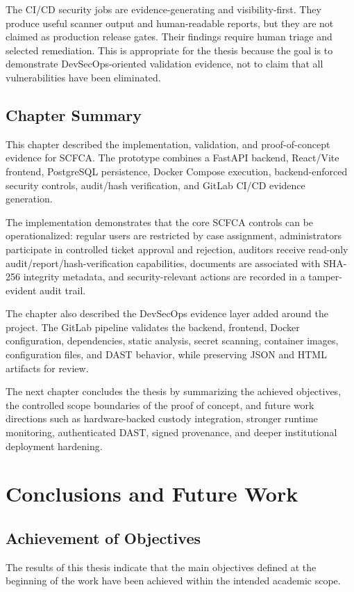 \documentclass[12pt,a4paper]{report}
\begin{document}
The CI/CD security jobs are evidence-generating and visibility-first. They produce useful scanner output and human-readable reports, but they are not claimed as production release gates. Their findings require human triage and selected remediation. This is appropriate for the thesis because the goal is to demonstrate DevSecOps-oriented validation evidence, not to claim that all vulnerabilities have been eliminated.

\section{Chapter Summary}

This chapter described the implementation, validation, and proof-of-concept evidence for SCFCA. The prototype combines a FastAPI backend, React/Vite frontend, PostgreSQL persistence, Docker Compose execution, backend-enforced security controls, audit/hash verification, and GitLab CI/CD evidence generation.

The implementation demonstrates that the core SCFCA controls can be operationalized: regular users are restricted by case assignment, administrators participate in controlled ticket approval and rejection, auditors receive read-only audit/report/hash-verification capabilities, documents are associated with SHA-256 integrity metadata, and security-relevant actions are recorded in a tamper-evident audit trail.

The chapter also described the DevSecOps evidence layer added around the project. The GitLab pipeline validates the backend, frontend, Docker configuration, dependencies, static analysis, secret scanning, container images, configuration files, and DAST behavior, while preserving JSON and HTML artifacts for review.

The next chapter concludes the thesis by summarizing the achieved objectives, the controlled scope boundaries of the proof of concept, and future work directions such as hardware-backed custody integration, stronger runtime monitoring, authenticated DAST, signed provenance, and deeper institutional deployment hardening.

\chapter{Conclusions and Future Work}
\section{Achievement of Objectives}
The results of this thesis indicate that the main objectives defined at the beginning of the work have been achieved within the intended academic scope.
\end{document}
